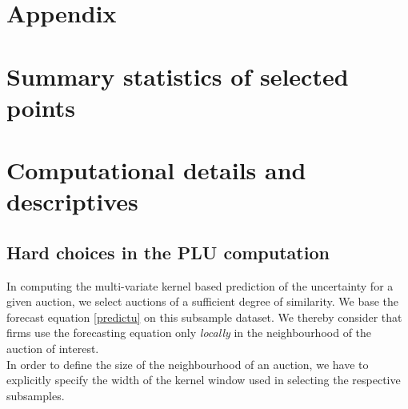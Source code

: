 \newpage
\begin{subappendices}
\section*{Appendix}

 \section{Summary statistics of selected points}
\label{tablestomatch}










\section{Computational details and descriptives}

\subsection{Hard choices in the PLU computation}
\label{hardchoicePLU}

In computing the multi-variate kernel based prediction of the uncertainty for a given auction, we select auctions of a sufficient degree of similarity. We base the forecast equation \ref{predictu} on this subsample dataset. We thereby consider that firms use the forecasting equation only \textit{locally} in the neighbourhood of the auction of interest. \\

In order to define the size of the neighbourhood of an auction, we have to explicitly specify the width of the kernel window used in selecting the respective subsamples. \\




\end{subappendices}
